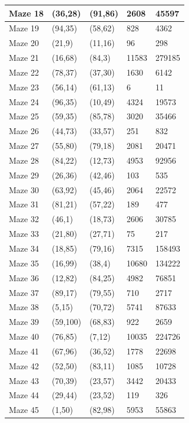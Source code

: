 \documentclass{article}
\begin{document}
\begin{table}
{\begin{tabular}{||p{1.5cm}|p{1.5cm}|p{1.5cm}|p{3.5cm}|p{3.5cm}||}
 \hline
 Maze 18 & (36,28) & (91,86) & 2608 & 45597\\
 \hline
 Maze 19 & (94,35) & (58,62) & 828 & 4362\\ 
 \hline
 Maze 20 & (21,9) & (11,16) & 96 & 298 \\
 \hline
 Maze 21 & (16,68) & (84,3) & 11583 & 279185\\
 \hline
 Maze 22 & (78,37) & (37,30) & 1630 & 6142\\
 \hline
 Maze 23 & (56,14) & (61,13) & 6 & 11\\
 \hline
 Maze 24 & (96,35) & (10,49) & 4324 & 19573\\ 
 \hline
 Maze 25 & (59,35) & (85,78) & 3020 & 35466\\
 \hline
  Maze 26 & (44,73) & (33,57) & 251 & 832\\
 \hline
 Maze 27 & (55,80) & (79,18) & 2081& 20471 \\
 \hline
 Maze 28 & (84,22) & (12,73) & 4953 & 92956 \\
 \hline
 Maze 29 & (26,36) & (42,46) & 103 & 535 \\
 \hline
 Maze 30 & (63,92) & (45,46) & 2064 & 22572 \\
 \hline
 Maze 31 & (81,21) & (57,22) & 189 & 477\\ 
 \hline
 Maze 32 & (46,1) & (18,73) & 2606 & 30785\\
 \hline
 Maze 33 & (21,80) & (27,71) & 75 & 217 \\
 \hline
 Maze 34 & (18,85) & (79,16) & 7315 & 158493\\
 \hline
 Maze 35 & (16,99) & (38,4) & 10680 & 134222 \\
 \hline
 Maze 36 & (12,82) & (84,25) & 4982 & 76851\\ 
 \hline
 Maze 37 & (89,17) & (79,55) & 710 & 2717\\
 \hline
  Maze 38 & (5,15) & (70,72) & 5741 & 87633 \\
 \hline
 Maze 39 & (59,100) & (68,83) & 922 & 2659\\
 \hline
 Maze 40 & (76,85) & (7,12) & 10035 & 224726\\
 \hline
 Maze 41 & (67,96) & (36,52) & 1778 & 22698 \\
 \hline
 Maze 42 & (52,50) & (83,11) & 1085 & 10728 \\
 \hline
 Maze 43 & (70,39) & (23,57) & 3442 & 20433\\ 
 \hline
 Maze 44 & (29,44) & (23,52) & 119 & 326 \\
 \hline
 Maze 45 & (1,50) & (82,98) & 5953 & 55863 \\

\end{tabular}}
\end{table}
\end{document}

